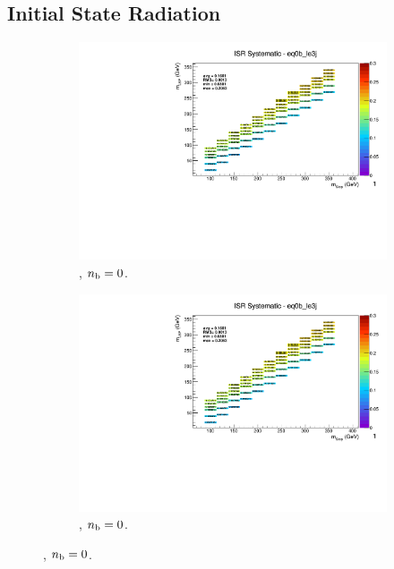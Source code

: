 \newpage
\subsection*{Initial State Radiation}
\label{sec:t2cc_isr_plots}

\begin{figure}[ht!]
  \centering
  \begin{subfigure}[b]{0.32\textwidth}
    \includegraphics[width=\textwidth, page=12]{Figs/sms/t2cc/v37_2/systs/T2cc_ISR_eq0b_le3j.pdf}
    \caption{\njlow, $n_{\text{b}} = 0$.}
  \end{subfigure}
  \begin{subfigure}[b]{0.32\textwidth}
    \includegraphics[width=\textwidth, page=8]{Figs/sms/t2cc/v37_2/systs/T2cc_ISR_eq0b_le3j.pdf}
    \caption{\njlow, $n_{\text{b}} = 0$.}
  \end{subfigure}

\end{figure}
